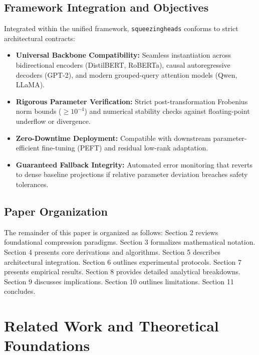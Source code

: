 \subsection{Framework Integration and Objectives}
Integrated within the unified framework, \texttt{squeezingheads} conforms to strict architectural contracts:
\begin{itemize}
\item \textbf{Universal Backbone Compatibility:} Seamless instantiation across bidirectional encoders (DistilBERT, RoBERTa), causal autoregressive decoders (GPT-2), and modern grouped-query attention models (Qwen, LLaMA).
\item \textbf{Rigorous Parameter Verification:} Strict post-transformation Frobenius norm bounds ($\ge 10^{-4}$) and numerical stability checks against floating-point underflow or divergence.
\item \textbf{Zero-Downtime Deployment:} Compatible with downstream parameter-efficient fine-tuning (PEFT) and residual low-rank adaptation.
\item \textbf{Guaranteed Fallback Integrity:} Automated error monitoring that reverts to dense baseline projections if relative parameter deviation breaches safety tolerances.
\end{itemize}

\subsection{Paper Organization}
The remainder of this paper is organized as follows: Section 2 reviews foundational compression paradigms. Section 3 formalizes mathematical notation. Section 4 presents core derivations and algorithms. Section 5 describes architectural integration. Section 6 outlines experimental protocols. Section 7 presents empirical results. Section 8 provides detailed analytical breakdowns. Section 9 discusses implications. Section 10 outlines limitations. Section 11 concludes.


\section{Related Work and Theoretical Foundations}

